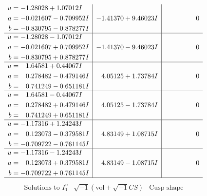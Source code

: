 \documentclass[1p]{elsarticle_modified}
\theoremstyle{definition}
\newcommand{\I}{\sqrt{-1}}
\begin{document}
$$\begin{array}{c|c|c}
\begin{aligned}
u &= -1.28028 + 1.07012 I \\
a &= -0.021607 - 0.709952 I \\
b &= -0.830795 - 0.878277 I\end{aligned}
 & -1.41370 + 9.46023 I & \phantom{-0.000000 } 0 \\ \hline\begin{aligned}
u &= -1.28028 - 1.07012 I \\
a &= -0.021607 + 0.709952 I \\
b &= -0.830795 + 0.878277 I\end{aligned}
 & -1.41370 - 9.46023 I & \phantom{-0.000000 } 0 \\ \hline\begin{aligned}
u &= \phantom{-}1.64581 + 0.44067 I \\
a &= \phantom{-}0.278482 - 0.479146 I \\
b &= \phantom{-}0.741249 - 0.651181 I\end{aligned}
 & \phantom{-}4.05125 + 1.73784 I & \phantom{-0.000000 } 0 \\ \hline\begin{aligned}
u &= \phantom{-}1.64581 - 0.44067 I \\
a &= \phantom{-}0.278482 + 0.479146 I \\
b &= \phantom{-}0.741249 + 0.651181 I\end{aligned}
 & \phantom{-}4.05125 - 1.73784 I & \phantom{-0.000000 } 0 \\ \hline\begin{aligned}
u &= -1.17316 + 1.24243 I \\
a &= \phantom{-}0.123073 - 0.379581 I \\
b &= -0.709722 - 0.761145 I\end{aligned}
 & \phantom{-}4.83149 + 1.08715 I & \phantom{-0.000000 } 0 \\ \hline\begin{aligned}
u &= -1.17316 - 1.24243 I \\
a &= \phantom{-}0.123073 + 0.379581 I \\
b &= -0.709722 + 0.761145 I\end{aligned}
 & \phantom{-}4.83149 - 1.08715 I & \phantom{-0.000000 } 0\\
 \hline 
 \end{array}$$\newpage$$\begin{array}{c|c|c}  
\text{Solutions to }I^u_{1}& \I (\text{vol} + \sqrt{-1}CS) & \text{Cusp shape}\\
 \hline 
\begin{aligned}

\end{aligned}
\end{array}$$
\end{document}
